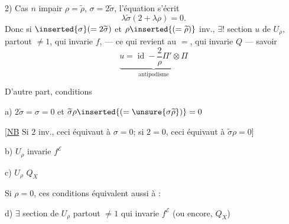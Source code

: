 2) Cas $n$ impair $\rho=\widetilde\rho$, $\sigma=2\widetilde\sigma$,
l'équation s'écrit
\[
\lambda\widetilde\sigma(2+\lambda\rho)=0.
\]
Donc si $\inserted{\sigma}(=2\widetilde\sigma)$ et $\rho\inserted{(=\widetilde\rho)}$ inv.,
 $\exists!$ section $u$ de $U_\rho$, partout $\ne1$,
 qui invarie $f$, --- ce qui revient au $=$, qui invarie $Q$ --- savoir
\[
\underbrace{u=\operatorname{id}-\frac{2}{\rho}\Pi'\otimes\Pi}_{\text{antipodisme}}
\]

D'autre part, conditions 
\deleted{$\unsure{\sigma}$}

a) $2\widetilde\sigma=\sigma=0$ et
$\widetilde\sigma\rho\inserted{(=\unsure{\sigma\widetilde\rho})}=0$

[\uline{NB} Si $2$ inv., ceci équivaut à $\sigma=0$; si $2=0$,
ceci équivaut à $\widetilde\sigma\rho=0$]

b) $U_\rho$ invarie $f^{\mathcal E}$

c) $U_\rho$ \unsure{---} $Q_X$

Si  $\rho=0$, ces conditions équivalent aussi à :

d) $\exists$  section de $U_\rho$ partout $\ne1$ qui
invarie $f^{\mathcal E}$ (ou encore, $Q_X$)

